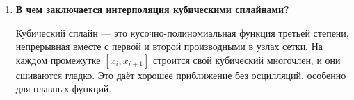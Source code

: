 \documentclass[a4paper,12pt]{article}
\begin{document}
\begin{enumerate}
\item \textbf{В чем заключается интерполяция кубическими сплайнами?}

	Кубический сплайн — это кусочно-полиномиальная функция третьей степени, непрерывная вместе с первой и второй производными в узлах сетки. На каждом промежутке \( [x_i, x_{i+1}] \) строится свой кубический многочлен, и они сшиваются гладко. Это даёт хорошее приближение без осцилляций, особенно для плавных функций.

\end{enumerate}
\end{document}
